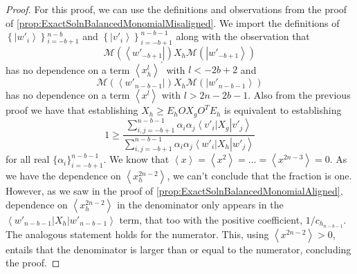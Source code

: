 \documentclass{theoretics}
\begin{document}
\begin{proof}
  For this proof, we can use the definitions and observations from the
  proof of \cref{prop:ExactSolnBalancedMonomialMisaligned}. We import
  the definitions of $\left\{ \left|w'_{i}\right\rangle \right\} {}_{i=-b+1}^{n-b}$
  and $\left\{ \left|v'_{i}\right\rangle \right\} _{i=-b+1}^{n-b-1}$
  along with the observation that
  \begin{displaymath}
    \mathcal{M}(\left\langle w'_{-b+1}\right|)X_{h}\mathcal{M}(\left|w'_{-b+1}\right\rangle )
  \end{displaymath}
  has no dependence on a term $\left\langle x_{h}^{l}\right\rangle ^{\prime}$
  with $l<-2b+2$
  and
  \begin{displaymath}
    \mathcal{M}(\left\langle w'_{n-b-1}\right|)X_{h}\mathcal{M}(\left|w'_{n-b-1}\right\rangle )
  \end{displaymath}
  has no dependence on a term $\left\langle x^{l}\right\rangle $ with
  $l>2n-2b-1$. Also from the previous
  proof we have that establishing $X_{h}\ge E_{h}OX_{g}O^{T}E_{h}$ is equivalent
  to establishing
  \begin{displaymath}
    1\ge\frac{\sum_{i,j=-b+1}^{n-b-1}\alpha_{i}\alpha_{j}\left\langle v'_{i}\right|X_{g}\left|v'_{j}\right\rangle }{\sum_{i,j=-b+1}^{n-b-1}\alpha_{i}\alpha_{j}\left\langle w'_{i}\right|X_{h}\left|w'_{j}\right\rangle }
  \end{displaymath}
  for all real $\{\alpha_{i}\}_{i=-b+1}^{n-b-1}$. We know that $\left\langle x\right\rangle =\left\langle x^{2}\right\rangle =\dots=\left\langle x^{2n-3}\right\rangle =0$.
  As we have the dependence on $\left\langle x_{h}^{2n-2}\right\rangle $,
  we can't conclude that the fraction is one. However, as we saw in
  the proof of \cref{prop:ExactSolnBalancedMonomialAligned}, dependence
  on $\left\langle x_{h}^{2n-2}\right\rangle $ in the denominator
  only appears in the $\left\langle w'_{n-b-1}\right|X_{h}\left|w'_{n-b-1}\right\rangle $
  term, that too with the positive coefficient, $1/c_{h_{n-b-1}}$.
  The analogous statement holds for the numerator. This, using $\left\langle x^{2n-2}\right\rangle >0$,
  entails that the denominator is larger than or equal to the numerator,
  concluding the proof.
\end{proof}
\end{document}
